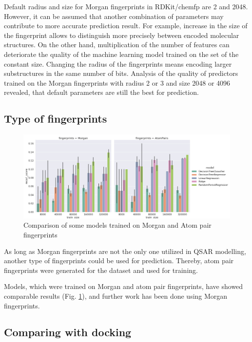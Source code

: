 Default radius and size for Morgan fingerprints in RDKit/chemfp are 2 and 2048.
However, it can be assumed that another combination of parameters may contribute 
to more accurate prediction result.
For example, increase in the size of the fingerprint allows to distinguish more 
precisely between encoded molecular structures. On the other hand, multiplication 
of the number of features can deteriorate the quality of the machine learning model 
trained on the set of the constant size.
Changing the radius of the fingerprints means encoding larger substructures  in 
the same number of bits.
Analysis of the quality of predictors trained on the Morgan fingerprints with radius 
2 or 3 and size 2048 or 4096 revealed, that default parameters are still the best 
for prediction.
\hfill\break
\subsection{Type of fingerprints}

\begin{figure}[H]
    \centering
    \includegraphics[width=\linewidth]{Images/MorganVSAtomPairs.jpg}
    \caption{Comparison of some models trained on Morgan and Atom pair fingerprints}
    \label{MvsAP}
\end{figure}

As long as Morgan fingerprints are not the only one utilized in QSAR modelling, 
another type of fingerprints could be used for prediction. 
Thereby, atom pair fingerprints were generated for the dataset and used for training. 

Models, which were trained on Morgan and atom pair fingerprints, have showed comparable 
results (Fig. \ref{MvsAP}), and further work has been done using Morgan fingerprints.

\hfill\break
\subsection{Comparing with docking}

